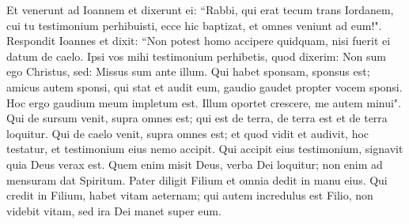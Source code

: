 \begin{biblechapter}
\verse Et venerunt ad Ioannem et dixerunt ei: “Rabbi, qui erat tecum trans Iordanem, cui tu testimonium perhibuisti, ecce hic baptizat, et omnes veniunt ad eum!". 
\verse Respondit Ioannes et dixit: “Non potest homo accipere quidquam, nisi fuerit ei datum de caelo. 
\verse Ipsi vos mihi testimonium perhibetis, quod dixerim: Non sum ego Christus, sed: Missus sum ante illum. 
\verse Qui habet sponsam, sponsus est; amicus autem sponsi, qui stat et audit eum, gaudio gaudet propter vocem sponsi. Hoc ergo gaudium meum impletum est. 
\verse Illum oportet crescere, me autem minui". 
\verse Qui de sursum venit, supra omnes est; qui est de terra, de terra est et de terra loquitur. Qui de caelo venit, supra omnes est; 
\verse et quod vidit et audivit, hoc testatur, et testimonium eius nemo accipit. 
\verse Qui accipit eius testimonium, signavit quia Deus verax est. 
\verse Quem enim misit Deus, verba Dei loquitur; non enim ad mensuram dat Spiritum. 
\verse Pater diligit Filium et omnia dedit in manu eius. 
\verse Qui credit in Filium, habet vitam aeternam; qui autem incredulus est Filio, non videbit vitam, sed ira Dei manet super eum. 
\end{biblechapter}

